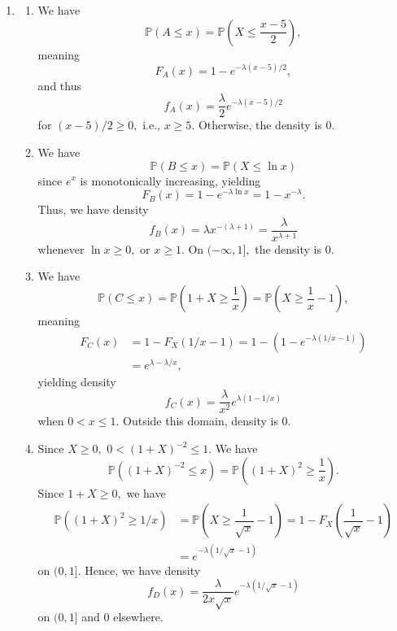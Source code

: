 \documentclass[12pt]{article}
\begin{document}
\begin{enumerate}
\begin{enumerate}
      \item Consider $Y = (a-b)U + b.$ Then, $$
        F_Y(x) = F_{U}((b - x) / (a - b)),$$
        for all $a \leq x \leq b,$
        and differentiating yields $$
        f_Y(x)  = \dfrac{1}{a - b}f_U((b - x)/ (a-b)) =
        \begin{cases}
          \dfrac{1}{a-b} & a \leq x \leq b \\
          0  & \text{otherwise},
        \end{cases}
        $$
        meaning $Y \sim \text{Uniform}(a, b).$
    \end{enumerate}

  \item
    \begin{enumerate}
      \item We have $$\mathbb P(A \leq x) = \mathbb P\left(X \leq
        \dfrac{x-5}{2}\right),$$
        meaning
        $$
        F_A(x) = 1-e^{-\lambda(x-5)/2},
        $$
        and thus
        $$
        f_A(x) = \frac{\lambda}{2} e^{-\lambda(x-5)/2}
        $$
        for $(x - 5)/ 2 \geq 0,$ i.e., $x \geq 5.$ Otherwise, the
        density is $0.$

      \item We have $$\mathbb P(B \leq x) = \mathbb P(X \leq \ln x)$$
        since $e^x$ is monotonically increasing, yielding
        $$
        F_B(x) = 1- e^{-\lambda \ln x} = 1-x^{-\lambda}.
        $$
        Thus, we have density
        $$
        f_B(x) = \lambda x^{-(\lambda + 1)} = \dfrac{\lambda}{x^{\lambda + 1}}
        $$ whenever $\ln x \geq 0,$ or $x \geq 1.$ On $(-\infty, 1],$
        the density is $0.$

      \item We have $$\mathbb P(C \leq x) = \mathbb P\left(1 + X \geq
        \dfrac{1}x\right) = \mathbb P\left(X \geq \dfrac{1}{x} - 1\right),$$
        meaning
        \begin{align*}
          F_C(x) &= 1 - F_X(1/x - 1) = 1 - (1 - e^{-\lambda(1/x - 1)}) \\
          &= e^{\lambda -\lambda/x } ,
        \end{align*}
        yielding density
        $$
        f_C(x) = \dfrac{\lambda}{x^2} e^{\lambda(1- 1/x)}
        $$
        when $0 < x \leq 1.$ Outside this domain, density is $0.$

      \item Since $X \geq 0,$ $0 < (1 + X)^{-2} \leq 1.$ We have
        $$
        \mathbb P((1+X)^{-2} \leq x) = \mathbb P\left((1+ X)^2 \geq
        \dfrac{1}{x}\right).
        $$
        Since $1 + X \geq 0,$ we have
        \begin{align*}
          \mathbb P((1+X)^2 \geq 1/x) &= \mathbb P\left(X \geq
          \dfrac{1}{\sqrt{x}} - 1\right) = 1 -
          F_X\left(\dfrac{1}{\sqrt x} - 1\right) \\
          &= e^{-\lambda(1/\sqrt x - 1)}
        \end{align*}
        on $(0, 1].$ Hence, we have density
        $$
        f_D(x) = \dfrac{\lambda}{2x\sqrt{x}} e^{-\lambda(1/\sqrt x -1 )}
        $$
        on $(0, 1]$ and $0$ elsewhere.
    \end{enumerate}


\end{enumerate}
\end{document}
